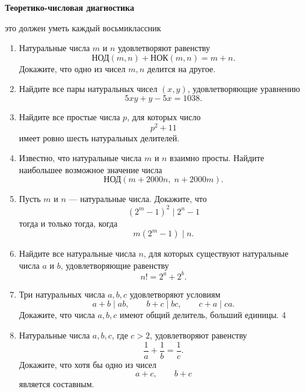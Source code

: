 \centerline{\bf \Huge Теоретико-числовая диагностика}

\begin{flushright}
        \scriptsize{это должен уметь каждый восьмиклассник}
\end{flushright}

\noindent

\begin{enumerate}

\item Натуральные числа $m$ и $n$ удовлетворяют равенству
\[
    \text{НОД}(m,n)+ \text{НОК}(m,n)=m+n.
\]
Докажите, что одно из чисел $m,n$ делится на другое.

\item Найдите все пары натуральных чисел $(x,y)$, удовлетворяющие
уравнению
\[
    5xy+y-5x=1038.
\]

\item Найдите все простые числа $p$, для которых число
\[
    p^2+11
\]
имеет ровно шесть натуральных делителей.

\item Известно, что натуральные числа $m$ и $n$ взаимно просты.
Найдите наибольшее возможное значение числа
\[
    \text{НОД}(m+2000n,\;n+2000m).
\]

\item Пусть $m$ и $n$ — натуральные числа. Докажите, что
\[
    (2^m-1)^2\mid 2^n-1
\]
тогда и только тогда, когда
\[
    m(2^m-1)\mid n.
\]

\item Найдите все натуральные числа $n$, для которых существуют
натуральные числа $a$ и $b$, удовлетворяющие равенству
\[
    n!=2^a+2^b.
\]


\item Три натуральных числа $a,b,c$ удовлетворяют условиям
\[
    a+b\mid ab,\qquad
    b+c\mid bc,\qquad
    c+a\mid ca.
\]
Докажите, что числа $a,b,c$ имеют общий делитель, больший единицы.
4%

\item Натуральные числа $a,b,c$, где $c>2$, удовлетворяют равенству
\[
    \frac1a+\frac1b=\frac1c.
\]
Докажите, что хотя бы одно из чисел
\[
    a+c,\qquad b+c
\]
является составным.

\end{enumerate}